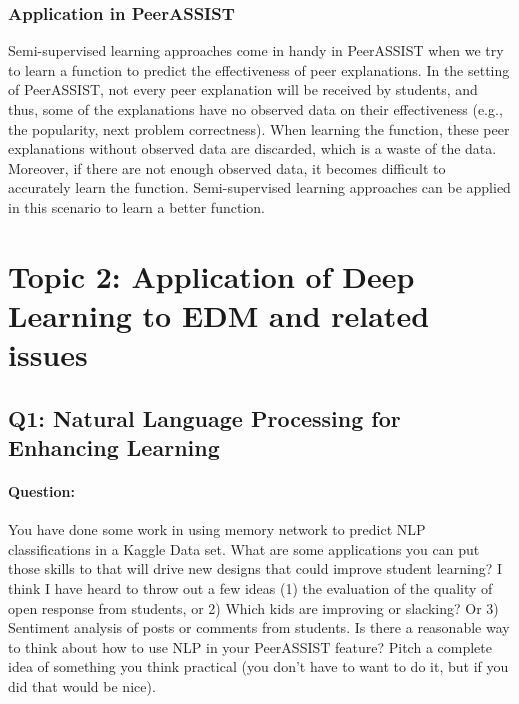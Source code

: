 \documentclass{article}
\begin{document}
\subsubsection{Application in PeerASSIST}
Semi-supervised learning approaches come in handy in PeerASSIST when
we try to learn a function to predict the effectiveness of peer
explanations. In the setting of PeerASSIST, not every peer explanation will be received by students,
and thus, some of the explanations have no observed data on their
effectiveness (e.g., the popularity, next problem correctness). When
learning the function, these peer explanations without observed data
are discarded, which is a waste of the data. Moreover, if there are not enough
observed data, it becomes difficult to accurately learn the
function. Semi-supervised learning approaches can be applied in this
scenario to learn a better function.

\section{Topic 2: Application of Deep Learning to EDM and related issues}
\subsection{Q1: Natural Language Processing for Enhancing Learning}
\paragraph{Question:} You have done some work in using memory network to
predict NLP classifications in a Kaggle Data set.   What are some
applications you can put those skills to that will drive new designs
that could improve student learning? I think I have heard to throw out
a few ideas (1) the evaluation of the quality of open response from
students, or 2) Which kids are improving or slacking? Or 3) Sentiment
analysis of posts or comments from students.  Is there a reasonable
way to think about how to use NLP in your PeerASSIST feature? Pitch a
complete idea of something you think practical  (you don't have to
want to do it, but if you did that would be nice). \\ [0.1 in]
\end{document}
